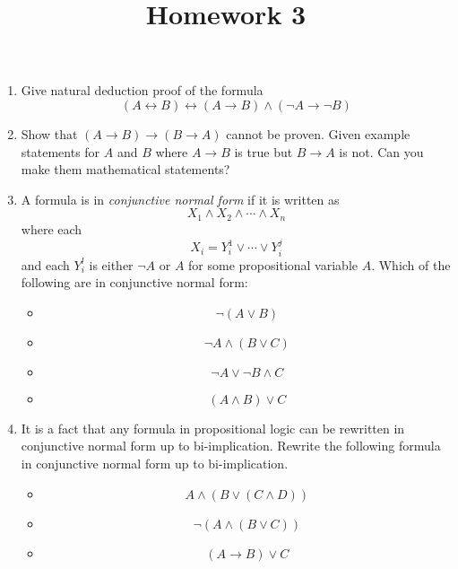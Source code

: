 \documentclass[12pt]{amsart}
\theoremstyle{definition}
\begin{document}
\title{Homework 3}

\maketitle

\begin{enumerate}
	\item Give natural deduction proof of the formula
	\begin{displaymath}
		(A \leftrightarrow B) \leftrightarrow (A \to B) \land (\neg A \to \neg B)
	\end{displaymath}

	\item Show that $(A \to B) \to (B \to A)$ cannot be proven. Given example statements 
		for $A$ and $B$ where $A \to B$ is true but $B \to A$ is not. Can you make 
		them mathematical statements?

	\item A formula is in \textit{conjunctive normal form} if it is written as 
	\begin{displaymath}
		X_1 \land X_2 \land \cdots \land X_n 
	\end{displaymath}
	where each 
	\begin{displaymath}
		X_i = Y^1_i \lor \cdots \lor Y^j_i
	\end{displaymath}
	and each $Y^l_i$ is either $\neg A$ or $A$ for some propositional variable $A$. 
	Which of the following are in conjunctive normal form:
	\begin{itemize}
		\item $$ \neg (A \lor B) $$
		\item $$ \neg A \land (B \lor C)$$
		\item $$ \neg A \lor \neg B \land C$$ 
		\item $$ (A \land B) \lor C$$
	\end{itemize}

	\item It is a fact that any formula in propositional logic can be rewritten in 
		conjunctive normal form up to bi-implication. Rewrite the following formula 
		in conjunctive normal form up to bi-implication. 
	\begin{itemize}
		\item $$A \land (B \lor (C \land D))$$ 
		\item $$\neg (A \land (B \lor C))$$
		\item $$(A \to B) \lor C$$ 
	\end{itemize}
		
		
\end{enumerate}
\end{document}
